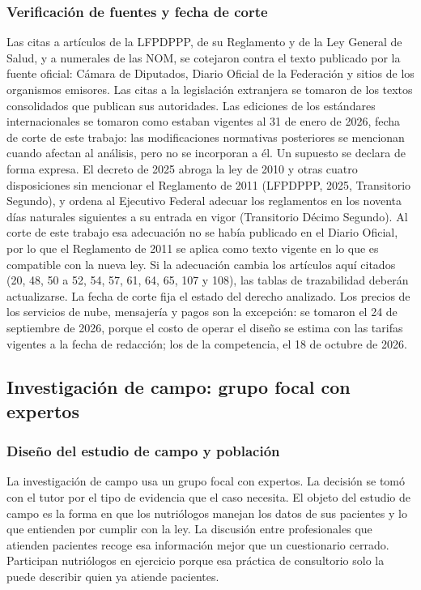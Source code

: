 \documentclass[12pt, a4paper]{article}
\begin{document}
\subsubsection{Verificación de fuentes y fecha de corte}
 
Las citas a artículos de la LFPDPPP, de su Reglamento y de la Ley
General de Salud, y a numerales de las NOM, se cotejaron contra el
texto publicado por la fuente oficial: Cámara de Diputados, Diario
Oficial de la Federación y sitios de los organismos emisores. Las citas
a la legislación extranjera se tomaron de los textos consolidados que
publican sus autoridades. Las ediciones de los estándares
internacionales se tomaron como estaban vigentes al 31 de enero de
2026, fecha de corte de este trabajo: las modificaciones normativas
posteriores se mencionan cuando afectan al análisis, pero no se
incorporan a él. Un supuesto se declara de forma expresa. El decreto
de 2025 abroga la ley de 2010 y otras cuatro disposiciones sin
mencionar el Reglamento de 2011 (LFPDPPP, 2025, Transitorio Segundo),
y ordena al Ejecutivo Federal adecuar los reglamentos en los noventa
días naturales siguientes a su entrada en vigor (Transitorio Décimo
Segundo). Al corte de este trabajo esa adecuación no se había
publicado en el Diario Oficial, por lo que el Reglamento de 2011 se
aplica como texto vigente en lo que es compatible con la nueva ley.
Si la adecuación cambia los artículos aquí citados
(20, 48, 50 a 52, 54, 57, 61, 64, 65, 107 y 108), las tablas de trazabilidad
deberán actualizarse. La fecha de corte fija el estado del derecho
analizado. Los precios de los servicios de nube, mensajería y pagos
son la excepción: se tomaron el 24 de septiembre de 2026, porque el
costo de operar el diseño se estima con las tarifas vigentes a la
fecha de redacción; los de la competencia, el 18 de octubre de 2026.
 
\subsection{Investigación de campo: grupo focal con expertos}
 
\subsubsection{Diseño del estudio de campo y población}
 
La investigación de campo usa un grupo focal con expertos. La decisión
se tomó con el tutor por el tipo de evidencia que el caso necesita. El
objeto del estudio de campo es la forma en que los nutriólogos manejan
los datos de sus pacientes y lo que entienden por cumplir con la ley. La
discusión entre profesionales que atienden pacientes recoge esa
información mejor que un cuestionario cerrado. Participan nutriólogos en
ejercicio porque esa práctica de consultorio solo la puede describir
quien ya atiende pacientes.
 
\end{document}
